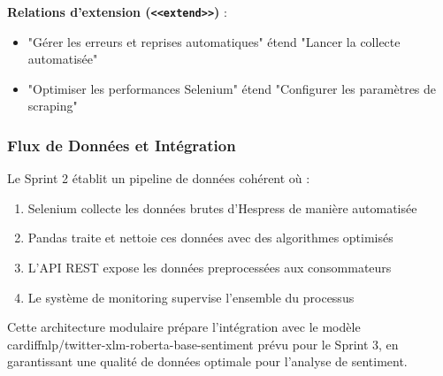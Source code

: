\textbf{Relations d'extension (\texttt{<<extend>>})} :
\begin{itemize}
    \item "Gérer les erreurs et reprises automatiques" étend "Lancer la collecte automatisée"
    \item "Optimiser les performances Selenium" étend "Configurer les paramètres de scraping"
\end{itemize}

\subsubsection{Flux de Données et Intégration}

Le Sprint 2 établit un pipeline de données cohérent où :
\begin{enumerate}
    \item Selenium collecte les données brutes d'Hespress de manière automatisée
    \item Pandas traite et nettoie ces données avec des algorithmes optimisés
    \item L'API REST expose les données preprocessées aux consommateurs
    \item Le système de monitoring supervise l'ensemble du processus
\end{enumerate}

Cette architecture modulaire prépare l'intégration avec le modèle cardiffnlp/twitter-xlm-roberta-base-sentiment prévu pour le Sprint 3, en garantissant une qualité de données optimale pour l'analyse de sentiment.
